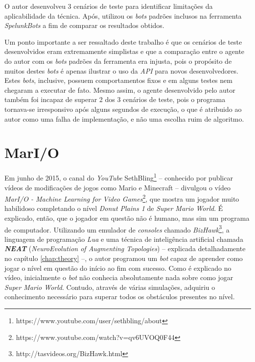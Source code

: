 O autor desenvolveu 3 cenários de teste para identificar limitações da
aplicabilidade da técnica. Após, utilizou os \textit{bots} padrões inclusos na
ferramenta \textit{SpelunkBots} a fim de comparar os resultados obtidos. 

Um ponto importante a ser ressaltado deste trabalho é que os cenários de teste
desenvolvidos eram extremamente simplistas e que a comparação entre o agente do
autor com os \textit{bots} padrões da ferramenta era injusta, pois o propósito
de muitos destes \textit{bots} é apenas ilustrar o uso da \textit{API} para
novos desenvolvedores. Estes \textit{bots}, inclusive, possuem comportamentos
fixos e em alguns testes nem chegaram a executar de fato. Mesmo assim, o agente
desenvolvido pelo autor também foi incapaz de superar 2 dos 3 cenários de teste,
pois o programa tornava-se irresponsivo após alguns segundos de execução, o que
é atribuido ao autor como uma falha de implementação, e não uma escolha ruim de
algoritmo.


\section{MarI/O}
Em junho de 2015, o canal do \textit{YouTube}
SethBling\footnote{https://www.youtube.com/user/sethbling/about} -- conhecido
por publicar vídeos de modificações de jogos como Mario e Minecraft -- divulgou
o vídeo \textit{MarI/O - Machine Learning for Video
Games}\footnote{https://www.youtube.com/watch?v=qv6UVOQ0F44}, que mostra um
jogador muito habilidoso completando o nível \textit{Donut Plains 1} de
\textit{Super Mario World}. É explicado, então, que o jogador em questão não é
humano, mas sim um programa de computador. Utilizando um emulador de
\textit{consoles} chamado
\textit{BizHawk}\footnote{http://tasvideos.org/BizHawk.html}, a linguagem de
programação \textit{Lua} e uma técnica de inteligência artificial chamada
\textit{\textbf{NEAT}} (\textit{NeuroEvolution of Augmenting Topologies})
\cite{stanley:ec02} -- explicada detalhadamente no capítulo \ref{chap:theory}
--, o autor programou um \textit{bot} capaz de aprender como jogar o nível em
questão do início ao fim com sucesso. Como é explicado no vídeo, inicialmente o
\textit{bot} não conhecia absolutamente nada sobre como jogar \textit{Super
Mario World}. Contudo, através de várias simulações, adquiriu o conhecimento
necessário para superar todos os obstáculos presentes no nível.

